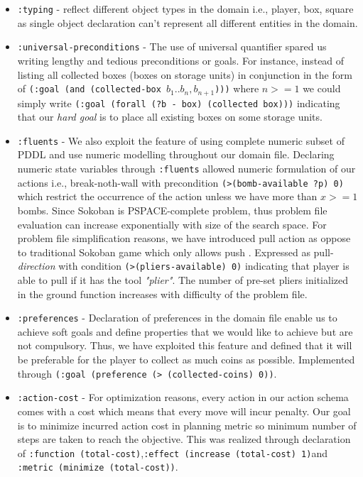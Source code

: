 \documentclass[letterpaper]{article} %
\begin{document}
\begin{itemize}
\item \texttt{:typing} - reflect different object types in the domain i.e., player, box, square as single object declaration can’t represent all different entities in the domain.
\item \texttt{:universal-preconditions} - The use of universal quantifier spared us writing lengthy and tedious preconditions or goals. For instance, instead of listing all collected boxes (boxes on storage units) in conjunction in the form of \texttt{(:goal (and (collected-box \(b_1 ..b_n, b_{n+1}\))))} where \(n >= 1\) we could simply write \texttt{(:goal (forall (?b - box) (collected box)))} indicating that our \emph{hard goal} is to place all existing boxes on some storage units.
\item \texttt{:fluents} - We also exploit the feature of using complete numeric subset of PDDL and use numeric modelling throughout our domain file. Declaring numeric state variables through \texttt{:fluents} allowed numeric formulation of our actions i.e., break-noth-wall with precondition
\texttt{(>(bomb-available ?p) 0)} which restrict the occurrence of the action unless we have more than \(x >= 1\) bombs. Since Sokoban is PSPACE-complete problem, thus problem file evaluation can increase exponentially with size of the search space. For problem file simplification reasons, we have introduced pull action as oppose to traditional Sokoban game which only allows push . Expressed as pull-\emph{direction} with condition \texttt{(>(pliers-available) 0)} indicating that player is able to pull if it has the tool \emph{"plier"}. The number of pre-set pliers initialized in the ground function increases with difficulty of the problem file.  
\item \texttt{:preferences} - Declaration of preferences in the domain file enable us to achieve soft goals and define properties that we would like to achieve but are not compulsory. Thus, we have exploited this feature and defined that it will be preferable for the player to collect as much coins as possible. Implemented through \texttt{(:goal (preference (> (collected-coins) 0))}.
\item \texttt{:action-cost} -  For optimization reasons, every action in our action schema comes with  a cost which means that every move will incur penalty.  Our goal is to minimize incurred action cost in planning metric so minimum number of steps are taken to reach the objective.  This was realized through declaration of \texttt{:function (total-cost)},\texttt{:effect (increase (total-cost) 1)}and\texttt{ :metric (minimize (total-cost))}. 
\end{itemize}
\end{document}
